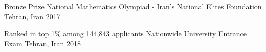 



\begin{cvhonors}

  \cvhonor
    {Bronze Prize} %
    {National Mathematics Olympiad - Iran's National Elites Foundation} %
    {Tehran, Iran} %
    {2017} %

  \cvhonor
    {Ranked in top 1\% among 144,843 applicants} %
    {Nationwide University Entrance Exam} %
    {Tehran, Iran} %
    {2018} %

\end{cvhonors}
